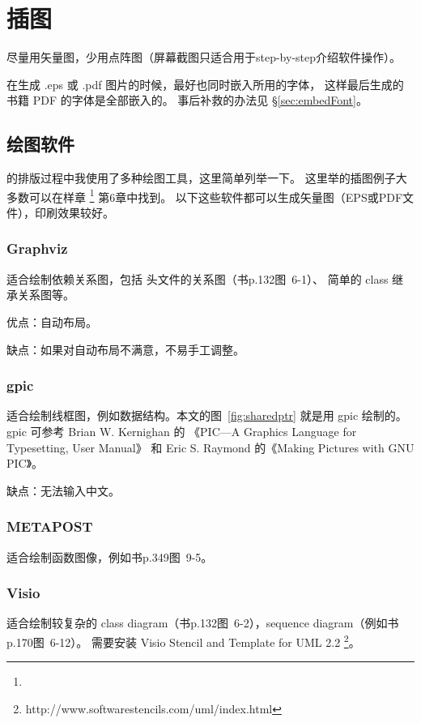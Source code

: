 \chapter{插图}

尽量用矢量图，少用点阵图（屏幕截图只适合用于step-by-step介绍软件操作）。

在生成 .eps 或 .pdf 图片的时候，最好也同时嵌入所用的字体，
这样最后生成的书籍 PDF 的字体是全部嵌入的。
事后补救的办法见 \S \ref{sec:embedFont}。

\section{绘图软件}

\mybooktitle 的排版过程中我使用了多种绘图工具，这里简单列举一下。
这里举的插图例子大多数可以在样章 \footnote{} 第6章中找到。
以下这些软件都可以生成矢量图（EPS或PDF文件），印刷效果较好。

\subsection{Graphviz}
适合绘制依赖关系图，包括  头文件的关系图（书p.132图~6-1）、
简单的 class 继承关系图等。

优点：自动布局。

缺点：如果对自动布局不满意，不易手工调整。
\subsection{gpic}

适合绘制线框图，例如数据结构。本文的图~\ref{fig:sharedptr} 就是用 gpic 绘制的。
gpic 可参考 Brian W. Kernighan 的 《PIC---A Graphics Language for Typesetting, User Manual》
和 Eric S. Raymond 的《Making Pictures with GNU PIC》。

缺点：无法输入中文。

\subsection{METAPOST}
适合绘制函数图像，例如书p.349图~9-5。

\subsection{Visio}
适合绘制较复杂的 class diagram（书p.132图~6-2），sequence diagram（例如书p.170图~6-12）。
需要安装 	
Visio Stencil and Template for UML 2.2
\footnote{http://www.softwarestencils.com/uml/index.html}。

